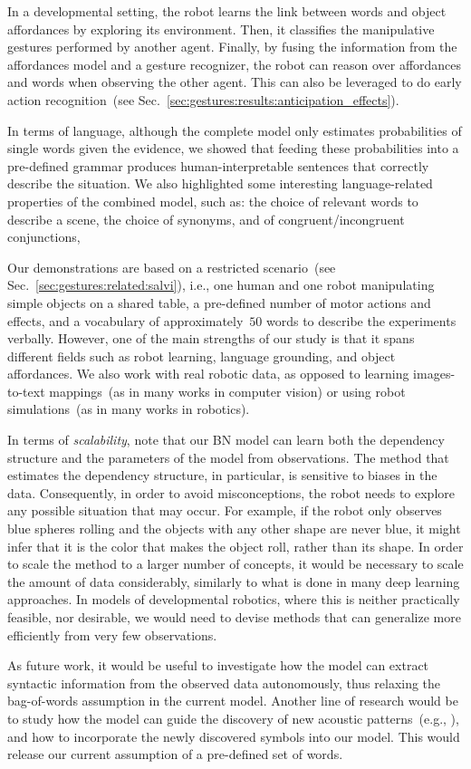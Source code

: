 In a developmental setting, the robot learns the link between words and object affordances by exploring its environment.
Then, it classifies the manipulative gestures performed by another agent.
Finally, by fusing the information from the affordances model and a gesture recognizer, the robot can reason over affordances and words when observing the other agent.
This can also be leveraged to do early action recognition~(see Sec.~\ref{sec:gestures:results:anticipation_effects}).

In terms of language, although the complete model only estimates probabilities of single words given the evidence, we showed that feeding these probabilities into a pre-defined grammar produces human-interpretable sentences that correctly describe the situation.
We also highlighted some interesting language-related properties of the combined model, such as:
the choice of relevant words to describe a scene,
the choice of synonyms,
and of congruent/incongruent conjunctions,

Our demonstrations are based on a restricted scenario~(see Sec.~\ref{sec:gestures:related:salvi}), i.e., one human and one robot manipulating simple objects on a shared table, a pre-defined number of motor actions and effects, and a vocabulary of approximately~$50$ words to describe the experiments verbally.
However, one of the main strengths of our study is that it spans different fields such as robot learning, language grounding, and object affordances.
We also work with real robotic data, as opposed to learning images-to-text mappings~(as in many works in computer vision) or using robot simulations~(as in many works in robotics).

In terms of \emph{scalability}, note that our \ac{BN} model can learn both the dependency structure and the parameters of the model from observations.
The method that estimates the dependency structure, in particular, is sensitive to biases in the data.
Consequently, in order to avoid misconceptions, the robot needs to explore any possible situation that may occur.
For example, if the robot only observes blue spheres rolling and the objects with any other shape are never blue, it might infer that it is the color that makes the object roll, rather than its shape.
In order to scale the method to a larger number of concepts, it would be necessary to scale the amount of data considerably, similarly to what is done in many deep learning approaches.
In models of developmental robotics, where this is neither practically feasible, nor desirable, we would need to devise methods that can generalize more efficiently from very few observations.

As future work, it would be useful to investigate how the model can extract syntactic information from the observed data autonomously, thus relaxing the bag-of-words assumption in the current model.
Another line of research would be to study how the model can guide the discovery of new acoustic patterns~(e.g., \cite{falstrom:2017:glu, vanhainen:2014:icassp, vanhainen:2012:interspeech}), and how to incorporate the newly discovered symbols into our \AffWords{} model.
This would release our current assumption of a pre-defined set of words.
